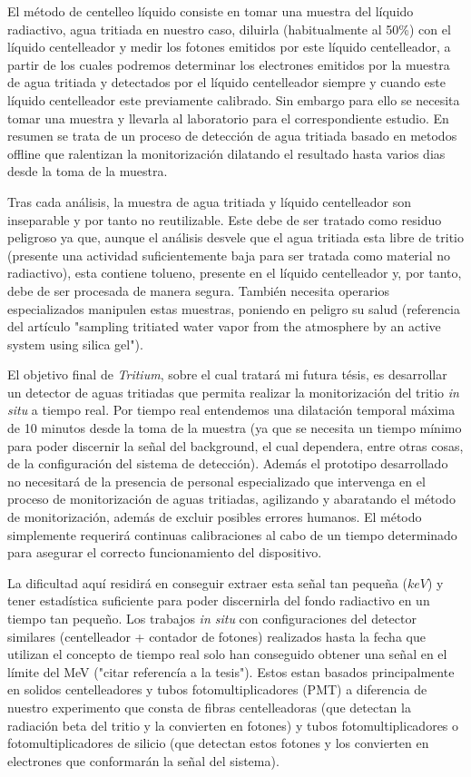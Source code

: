 El método de centelleo líquido consiste en tomar una muestra del líquido radiactivo, agua tritiada en nuestro caso, diluirla (habitualmente al 50\%) con el líquido centelleador y medir los fotones emitidos por este líquido centelleador, a partir de los cuales podremos determinar los electrones emitidos por la muestra de agua tritiada y detectados por el líquido centelleador siempre y cuando este líquido centelleador este previamente calibrado. Sin embargo para ello se necesita tomar una muestra y llevarla al laboratorio para el correspondiente estudio. En resumen se trata de un proceso de detección de agua tritiada basado en metodos offline que ralentizan la monitorización dilatando el resultado hasta varios dias desde la toma de la muestra. 

Tras cada análisis, la muestra de agua tritiada y líquido centelleador son inseparable y por tanto no reutilizable.  Este debe de ser tratado como residuo peligroso ya que, aunque el análisis desvele que el agua tritiada esta libre de tritio (presente una actividad suficientemente baja para ser tratada como material no radiactivo), esta contiene tolueno, presente en el líquido centelleador y, por tanto, debe de ser procesada de manera segura. También necesita operarios especializados manipulen estas muestras, poniendo en peligro su salud (referencia del artículo "sampling tritiated water vapor from the atmosphere by an active system using silica gel").

El objetivo final de \textit{Tritium}, sobre el cual tratará mi futura tésis, es desarrollar un detector de aguas tritiadas que permita realizar la monitorización del tritio \textit{in situ} a tiempo real. Por tiempo real entendemos una dilatación temporal máxima de 10 minutos desde la toma de la muestra (ya que se necesita un tiempo mínimo para poder discernir la señal del background, el cual dependera, entre otras cosas, de la configuración del sistema de detección). Además el prototipo desarrollado no necesitará de la presencia de personal especializado que intervenga en el proceso de monitorización de aguas tritiadas, agilizando y abaratando el método de monitorización, además de excluir posibles errores humanos. El método simplemente requerirá continuas calibraciones al cabo de un tiempo determinado para asegurar el correcto funcionamiento del dispositivo. 

La dificultad aquí residirá en conseguir extraer esta señal tan pequeña ($keV$) y tener estadística suficiente para poder discernirla del fondo radiactivo en un tiempo tan pequeño. Los trabajos \textit{in situ} con configuraciones del detector similares (centelleador + contador de fotones) realizados hasta la fecha que utilizan el concepto de tiempo real solo han conseguido obtener una señal en el límite del MeV ("citar referencía a la tesis"). Estos estan basados principalmente en solidos centelleadores y tubos fotomultiplicadores (PMT) a diferencia de nuestro experimento que consta de fibras centelleadoras (que detectan la radiación beta del tritio y la convierten en fotones) y tubos fotomultiplicadores o fotomultiplicadores de silicio (que detectan estos fotones y los convierten en electrones que conformarán la señal del sistema). 

